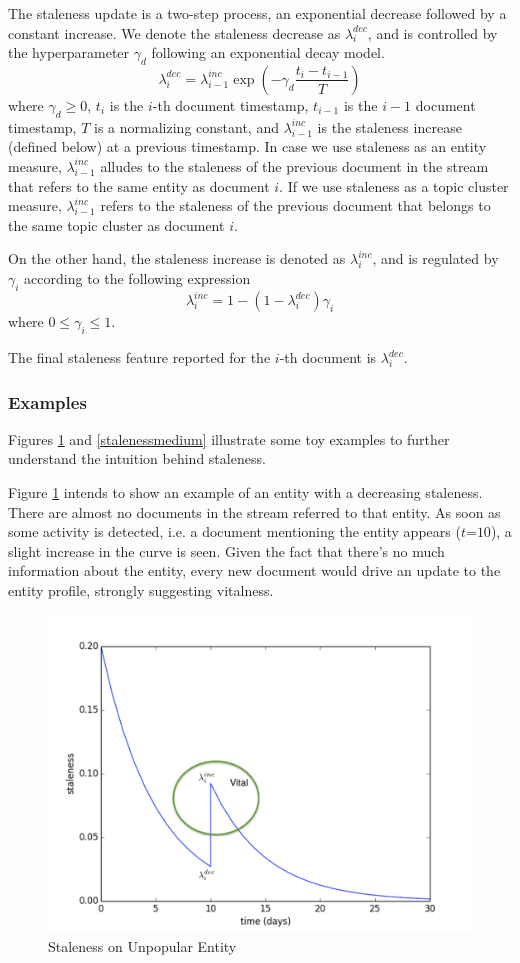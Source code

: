 \documentclass{article}
\begin{document}
The staleness update is a two-step process, an exponential decrease followed by a constant increase.
We denote the staleness decrease as $\lambda^{dec}_i$, and is controlled by the hyperparameter $\gamma_d$ following an exponential decay model.
\begin{equation}
\label{decrease}
\lambda^{dec}_i = \lambda^{inc}_{{i-1}} \exp{(-\gamma_d \frac{t_i-t_{i-1}}{T})}
\end{equation}
where $\gamma_d \geq 0$, $t_i$ is the $i$-th document timestamp, $t_{i-1}$ is the $i-1$ document timestamp, $T$ is a normalizing constant, and $\lambda^{inc}_{i-1}$ is the staleness increase (defined below) at a previous timestamp.
In case we use staleness as an entity measure, $\lambda^{inc}_{i-1}$ alludes to the staleness of the previous document in the stream that refers to the same entity as document $i$.
If we use staleness as a topic cluster measure, $\lambda^{inc}_{i-1}$ refers to the staleness of the previous document that belongs to the same topic cluster as document $i$.

On the other hand, the staleness increase is denoted as $\lambda^{inc}_i$, and is regulated by $\gamma_i$ according to the following expression
\begin{equation}
\lambda^{inc}_i = 1 - (1 - \lambda^{dec}_i) \gamma_i
\end{equation}
where $0 \leq \gamma_i \leq 1$.

The final staleness feature reported for the $i$-th document is $\lambda^{dec}_i$.

\subsubsection{Examples}

Figures \ref{stalenesslow} and \ref{stalenessmedium} illustrate some toy examples to further understand the intuition behind staleness.

Figure \ref{stalenesslow} intends to show an example of an entity with a decreasing staleness. There are almost no documents in the stream referred to that entity. As soon as some activity is detected, i.e. a document mentioning the entity appears ($t\mathord{=}10$), a slight increase in the curve is seen. Given the fact that there's no much information about the entity, every new document would drive an update to the entity profile, strongly suggesting vitalness.

\begin{figure}[h!]
\centering
\includegraphics[width=.5\textwidth]{staleness1.pdf}
\caption{Staleness on Unpopular Entity}
\label{stalenesslow}
\end{figure}
\end{document}
